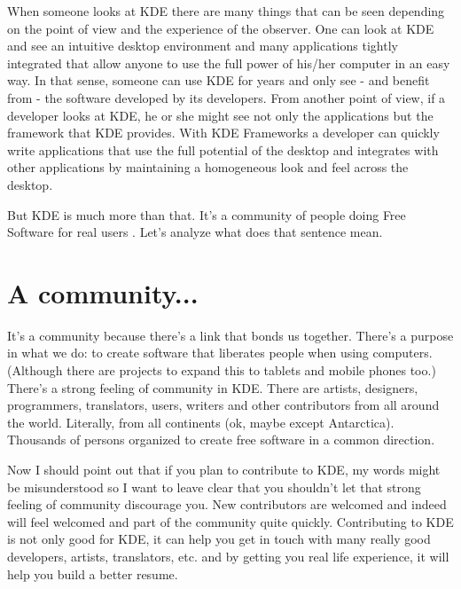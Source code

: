 

\noindent{}When someone looks at KDE there are many things that can be seen depending on the point of view and the experience of the observer. One can look at KDE and see an intuitive desktop environment and many applications tightly integrated that allow anyone to use the full power of his/her computer in an easy way. In that sense, someone can use KDE for years and only see - and benefit from - the software developed by its developers. From another point of view, if a developer looks at KDE, he or she might see not only the applications but the framework that KDE provides. With KDE Frameworks a developer can quickly write applications that use the full potential of the desktop and integrates with other applications by maintaining a homogeneous look and feel across the desktop. 

But KDE is much more than that. It’s a community of people doing Free Software for real users . Let’s analyze what does that sentence mean.

\section*{A community...}
It’s a community because there’s a link that bonds us together. There’s a purpose in what we do: to create software that liberates people when using computers. (Although there are projects to expand this to tablets and mobile phones too.) There’s a strong feeling of community in KDE. There are artists, designers, programmers, translators, users, writers and other contributors from all around the world. Literally, from all continents (ok, maybe except Antarctica). Thousands of persons organized to create free software in a common direction. 

Now I should point out that if you plan to contribute to KDE, my words might be misunderstood so I want to leave clear that you shouldn’t let that strong feeling of community discourage you. New contributors are welcomed and indeed will feel welcomed and part of the community quite quickly. Contributing to KDE is not only good for KDE, it can help you get in touch with many really good developers, artists, translators, etc. and by getting you real life experience, it will help you build a better resume.

